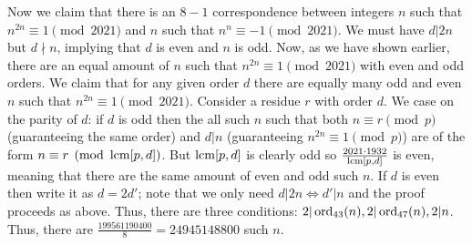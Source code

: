 \begin{solution}
    Now we claim that there is an $8-1$ correspondence between integers $n$ such that $n^{2n} \equiv 1 \pmod{2021}$ 
    and $n$ such that $n^n \equiv -1 \pmod{2021}$. We must have $d|2n$ but $d\nmid n$, implying 
    that $d$ is even and $n$ is odd. Now, as we have shown earlier, there are an equal amount of 
    $n$ such that $n^{2n} \equiv 1 \pmod{2021}$ with even and odd orders. We claim that for any given order $d$ 
    there are equally many odd and even $n$ such that $n^{2n} \equiv 1 \pmod{2021}$. Consider a 
    residue $r$ with order $d$. We case on the parity of $d$: if $d$ is odd then the all such 
    $n$ such that both $n \equiv r \pmod{p}$ (guaranteeing the same order) and $d|n$ (guaranteeing $n^{2n} \equiv 1 \pmod{p}$) 
    are of the form $n \equiv r \pmod{\operatorname{lcm}[p, d]}$. But $\operatorname{lcm}[p, d]$ is clearly odd so $\frac{2021 \cdot 1932}{\operatorname{lcm}[p,d]}$ 
    is even, meaning that there are the same amount of even and odd such $n$. If $d$ is even 
    then write it as $d = 2d'$; note that we only need $d|2n \iff d'|n$ and the proof proceeds as above. 
    Thus, there are three conditions: $2|\operatorname{ord}_{43}(n), 2|\operatorname{ord}_{47}(n), 2|n$. Thus, there are 
    $\frac{199561190400}{8} = \boxed{24945148800}$ such $n$. 

\end{solution}\bigskip
